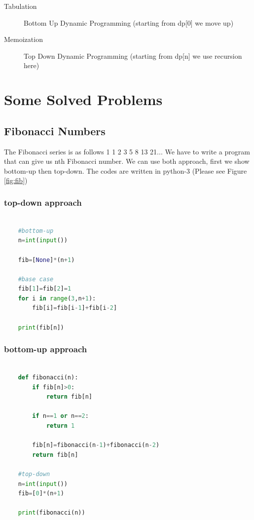 \documentclass[12pt]{article}
\begin{document}
	\begin{description}
		\item[Tabulation] Bottom Up Dynamic Programming (starting from dp[0] we move up) 
		\item[Memoization] Top Down Dynamic Programming (starting from dp[n] we use recursion here)
	\end{description}

\section{Some Solved Problems}
\subsection{Fibonacci Numbers}
The Fibonacci series is as follows 1 1 2 3 5 8 13 21...
We have to write a program that can give us nth Fibonacci number. We can use both approach,
first we show bottom-up then top-down. The codes are written in python-3\newline
(Please see Figure \ref{fig:fib}) 
\subsubsection{top-down approach}
\begin{lstlisting}[language=python]
	
	#bottom-up
	n=int(input())
	
	fib=[None]*(n+1)
	
	#base case
	fib[1]=fib[2]=1
	for i in range(3,n+1):
		fib[i]=fib[i-1]+fib[i-2]
	
	print(fib[n])
\end{lstlisting}


\subsubsection{bottom-up approach}
\begin{lstlisting}[language=python]

	def fibonacci(n):
		if fib[n]>0:
			return fib[n]
		
		if n==1 or n==2:
			return 1
		
		fib[n]=fibonacci(n-1)+fibonacci(n-2)
		return fib[n]
	
	#top-down
	n=int(input())
	fib=[0]*(n+1)
	
	print(fibonacci(n))
\end{lstlisting}
\end{document}
